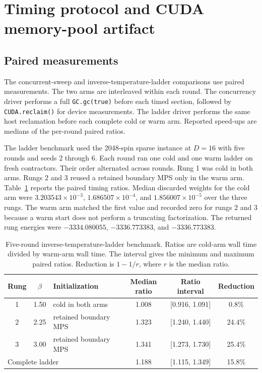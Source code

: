 \section{Timing protocol and CUDA memory-pool artifact}
\label{sec:supp-timing}

\subsection{Paired measurements}

The concurrent-sweep and inverse-temperature-ladder comparisons use paired
measurements. The two arms are interleaved within each round. The concurrency
driver performs a full \texttt{GC.gc(true)} before each timed section, followed
by \texttt{CUDA.reclaim()} for device measurements. The ladder driver performs
the same host reclamation before each complete cold or warm arm. Reported
speed-ups are medians of the per-round paired ratios.

The ladder benchmark used the 2048-spin sparse instance at $D=16$ with five
rounds and seeds 2 through 6. Each round ran one cold and one warm ladder on
fresh contractors. Their order alternated across rounds. Rung 1 was cold in
both arms. Rungs 2 and 3 reused a retained boundary MPS only in the warm arm.
Table~\ref{tab:supp-ladder} reports the paired timing ratios. Median discarded
weights for the cold arm were $3.203543\times10^{-3}$,
$1.686507\times10^{-4}$, and $1.856007\times10^{-5}$ over the three rungs. The
warm arm matched the first value and recorded zero for rungs 2 and 3 because a
warm start does not perform a truncating factorization. The returned rung
energies were $-3334.080055$, $-3336.773383$, and $-3336.773383$.

\begin{table}[htbp]
\footnotesize
\centering
\caption{Five-round inverse-temperature-ladder benchmark. Ratios are cold-arm
wall time divided by warm-arm wall time. The interval gives the minimum and
maximum paired ratios. Reduction is $1-1/r$, where $r$ is the median ratio.}
\label{tab:supp-ladder}
\begin{tabular}{@{}cclccc@{}}
\toprule
Rung & $\beta$ & Initialization &
Median ratio & Ratio interval & Reduction \\
\midrule
1 & 1.50 & cold in both arms & 1.008 & [0.916, 1.091] & 0.8\% \\
2 & 2.25 & retained boundary MPS & 1.323 & [1.240, 1.440] & 24.4\% \\
3 & 3.00 & retained boundary MPS & 1.341 & [1.273, 1.730] & 25.4\% \\
\midrule
\multicolumn{3}{l}{Complete ladder} &
1.188 & [1.115, 1.349] & 15.8\% \\
\bottomrule
\end{tabular}
\end{table}

